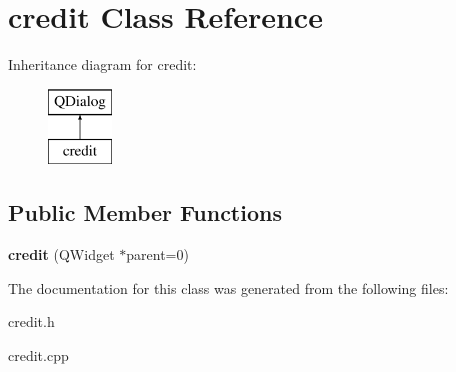 \hypertarget{classcredit}{}\section{credit Class Reference}
\label{classcredit}
Inheritance diagram for credit\+:\begin{figure}[H]
\begin{center}
\leavevmode
\includegraphics[height=2.000000cm]{classcredit}
\end{center}
\end{figure}
\subsection*{Public Member Functions}
\begin{DoxyCompactItemize}
\item 
\hypertarget{classcredit_a834ab6df70c91d8c4dde059f19d1fde7}{}\label{classcredit_a834ab6df70c91d8c4dde059f19d1fde7} 
{\bfseries credit} (Q\+Widget $\ast$parent=0)
\end{DoxyCompactItemize}


The documentation for this class was generated from the following files\+:\begin{DoxyCompactItemize}
\item 
credit.\+h\item 
credit.\+cpp\end{DoxyCompactItemize}
